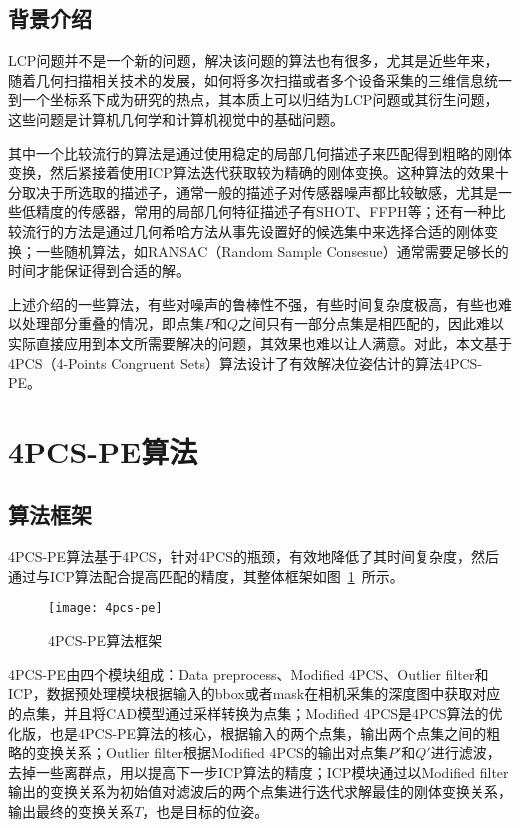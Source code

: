 \subsection{背景介绍}
LCP问题并不是一个新的问题，解决该问题的算法也有很多，尤其是近些年来，随着几何扫描相关技术的发展，如何将多次扫描或者多个设备采集的三维信息统一到一个坐标系下成为研究的热点，其本质上可以归结为LCP问题或其衍生问题，这些问题是计算机几何学和计算机视觉中的基础问题。

其中一个比较流行的算法是通过使用稳定的局部几何描述子来匹配得到粗略的刚体变换，然后紧接着使用ICP算法迭代获取较为精确的刚体变换\cite{li2005multiscale}。这种算法的效果十分取决于所选取的描述子，通常一般的描述子对传感器噪声都比较敏感，尤其是一些低精度的传感器，常用的局部几何特征描述子有SHOT\cite{salti2014shot}、FFPH\cite{rusu2009fast}等；还有一种比较流行的方法是通过几何希哈方法从事先设置好的候选集中来选择合适的刚体变换\cite{wolfson1997geometric}；一些随机算法，如RANSAC（Random Sample Consesue）\cite{bolles1981ransac}通常需要足够长的时间才能保证得到合适的解。

上述介绍的一些算法，有些对噪声的鲁棒性不强，有些时间复杂度极高，有些也难以处理部分重叠的情况，即点集$P$和$Q$之间只有一部分点集是相匹配的，因此难以实际直接应用到本文所需要解决的问题，其效果也难以让人满意。对此，本文基于4PCS（4-Points Congruent Sets）算法设计了有效解决位姿估计的算法4PCS-PE。

\section{4PCS-PE算法}
\subsection{算法框架}
4PCS-PE算法基于4PCS，针对4PCS的瓶颈，有效地降低了其时间复杂度，然后通过与ICP算法配合提高匹配的精度，其整体框架如图~\ref{fig:4pcs-pe}~所示。
\begin{figure}[ht]
  \centering
  \texttt{[image: 4pcs-pe]}
  \caption{4PCS-PE算法框架}
  \label{fig:4pcs-pe}
\end{figure}
4PCS-PE由四个模块组成：Data preprocess、Modified 4PCS、Outlier filter和ICP，数据预处理模块根据输入的bbox或者mask在相机采集的深度图中获取对应的点集，并且将CAD模型通过采样转换为点集；Modified 4PCS是4PCS算法的优化版，也是4PCS-PE算法的核心，根据输入的两个点集，输出两个点集之间的粗略的变换关系；Outlier filter根据Modified 4PCS的输出对点集$P'$和$Q'$进行滤波，去掉一些离群点，用以提高下一步ICP算法的精度；ICP模块通过以Modified filter输出的变换关系为初始值对滤波后的两个点集进行迭代求解最佳的刚体变换关系，输出最终的变换关系$T$，也是目标的位姿。

